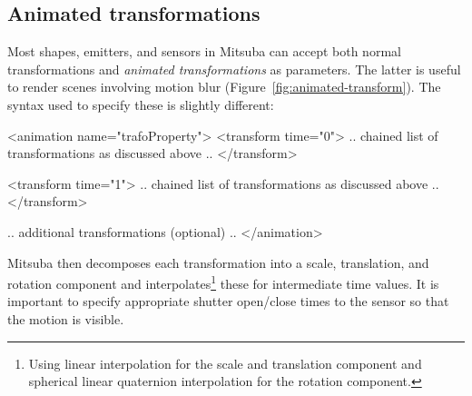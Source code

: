 \subsection{Animated transformations}
Most shapes, emitters, and sensors in Mitsuba can accept both normal transformations
and \emph{animated transformations} as parameters. The latter is useful to
render scenes involving motion blur (Figure~\ref{fig:animated-transform}). The syntax used to specify these
is slightly different:
\begin{xml}
<animation name="trafoProperty">
  <transform time="0">
     .. chained list of transformations as discussed above ..
  </transform>

  <transform time="1">
     .. chained list of transformations as discussed above ..
  </transform>

  .. additional transformations (optional) ..
</animation>
\end{xml}

Mitsuba then decomposes each transformation into a scale, translation, and
rotation component and interpolates\footnote{Using linear interpolation
for the scale and translation component and spherical linear quaternion
interpolation for the rotation component.} these for intermediate
time values.
It is important to specify appropriate shutter open/close times
to the sensor so that the motion is visible.
\newpage
